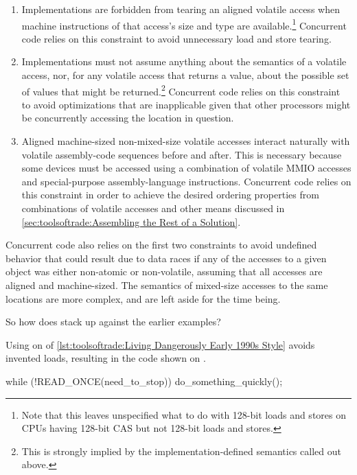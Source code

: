 \begin{enumerate}
\item	Implementations are forbidden from tearing an aligned volatile
	access when machine instructions of that access's size and type
	are available.\footnote{
		Note that this leaves unspecified what to do with 128-bit
		loads and stores on CPUs having 128-bit CAS but not
		128-bit loads and stores.}
	Concurrent code relies on this constraint to avoid unnecessary
	load and store tearing.
\item	Implementations must not assume anything about the semantics of
	a volatile access, nor, for any volatile access that returns a
	value, about the possible set of values that might be
	returned.\footnote{
		This is strongly implied by the implementation-defined
		semantics called out above.}
	Concurrent code relies on this constraint to avoid optimizations
	that are inapplicable given that other processors might be
	concurrently accessing the location in question.
\item	Aligned machine-sized non-mixed-size volatile accesses interact
	naturally with volatile assembly-code sequences before and after.
	This is necessary because some devices must be accessed using
	a combination of volatile MMIO accesses and special-purpose
	assembly-language instructions.
	Concurrent code relies on this constraint in order to achieve
	the desired ordering properties from combinations of volatile
	accesses and other means discussed in
	\cref{sec:toolsoftrade:Assembling the Rest of a Solution}.
\end{enumerate}

Concurrent code also relies on the first two constraints to avoid
undefined behavior that could result due to data races if any of the
accesses to a given object was either non-atomic or non-volatile,
assuming that all accesses are aligned and machine-sized.
The semantics of mixed-size accesses to the same locations are more
complex, and are left aside for the time being.

So how does  stack up against the earlier examples?

\begin{fcvref}
Using  on  of
\cref{lst:toolsoftrade:Living Dangerously Early 1990s Style}
avoids invented loads,
resulting in the code shown on .
\end{fcvref}

\begin{listing}
\begin{fcvlabel}
\begin{VerbatimL}[commandchars=\\\{\}]
while (!READ_ONCE(need_to_stop))
	do_something_quickly();
\end{VerbatimL}
\end{fcvlabel}
\caption{Preventing Load Fusing}
\label{lst:toolsoftrade:Preventing Load Fusing}
\end{listing}


